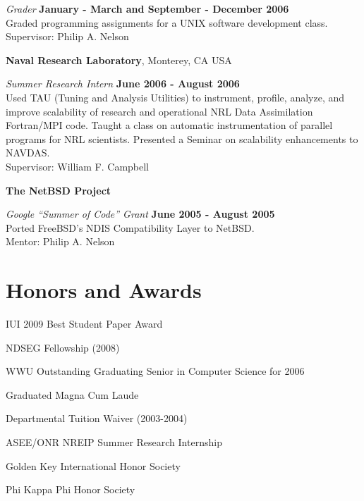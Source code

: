 \documentclass[margin,line]{res}
\begin{document}
\begin{resume}
{\em Grader} \hfill {\bf January - March and
			 September - December 2006} \\
Graded programming assignments for a UNIX software development class. \\
Supervisor: Philip A. Nelson

{\bf Naval Research Laboratory},
Monterey, CA USA

\vspace{-.3cm}
{\em Summer Research Intern} \hfill {\bf June 2006 - August 2006}\\
Used TAU (Tuning and Analysis Utilities) to instrument, profile, analyze,
and improve scalability of research and operational NRL Data Assimilation 
Fortran/MPI code.  Taught a class on automatic instrumentation of parallel 
programs for NRL scientists.  Presented a Seminar on scalability enhancements
to NAVDAS.\\
Supervisor: William F. Campbell

{\bf The NetBSD Project}

\vspace{-.3cm}
{\em Google ``Summer of Code'' Grant} \hfill {\bf June 2005 - August 2005}\\
Ported FreeBSD's NDIS Compatibility Layer to NetBSD. \\
Mentor: Philip A. Nelson

\section{\sc Honors and Awards}

IUI 2009 Best Student Paper Award
\vspace*{-2.5mm}

NDSEG Fellowship (2008)
\vspace*{-2.5mm}

WWU Outstanding Graduating Senior in Computer Science for 2006
\vspace*{-2.5mm}

Graduated Magna Cum Laude
\vspace*{-2.5mm}

Departmental Tuition Waiver (2003-2004)
\vspace*{-2.5mm}

ASEE/ONR NREIP Summer Research Internship
\vspace*{-2.5mm}

Golden Key International Honor Society
\vspace*{-2.5mm}

Phi Kappa Phi Honor Society


\end{resume}
\end{document}
